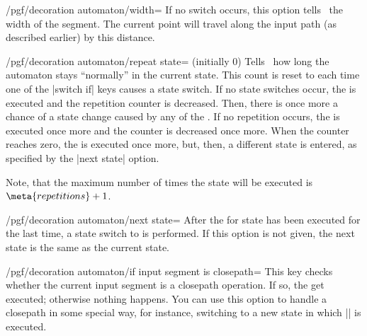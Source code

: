 \begin{command}{\pgfdeclaredecoration{}}
\begin{command}{\state{}}
\begin{key}{/pgf/decoration automaton/width=}
      If no switch occurs, this option tells \pgfname\ the width of
      the segment. The current point will travel along the input path
      (as described earlier)   by this distance.
    \end{key}
    \begin{key}{/pgf/decoration automaton/repeat state= (initially 0)}
      Tells \pgfname\ how long the automaton stays ``normally'' in the
      current state. This count is reset to  each
      time one of the |switch if| keys causes a state switch. If no
      state switches occur, the  is executed and the
      repetition counter is decreased. Then, there is once more a
      chance of a state change caused by any of the . If
      no repetition occurs, the  is executed 
      once more and the counter is decreased once more. When the
      counter reaches zero, the  is executed once more,
      but, then, a different state is entered, as specified by the
      |next state| option.

      Note, that the maximum number of times the state will be executed 
      is $\meta{repetitions}+1$.
    \end{key}
    \begin{key}{/pgf/decoration automaton/next state=}
      After the  for state has been executed for the last
      time, a state switch to  is performed. If this
      option is not given, the next state is the same as the current state.
    \end{key}

    \begin{key}{/pgf/decoration automaton/if input segment is closepath=}
      This key checks whether the current input segment is a closepath
      operation. If so, the  get executed; otherwise
      nothing happens. You can use this option to handle a closepath
      in some special way, for instance, switching to a new state in
      which |\pgfpathclose| is executed.
    \end{key}


\end{command}
\end{command}
